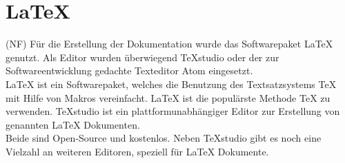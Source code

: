 \section{LaTeX}
(NF) Für die Erstellung der Dokumentation wurde das Softwarepaket LaTeX genutzt. Als Editor wurden überwiegend TeXstudio oder der zur Softwareentwicklung gedachte Texteditor Atom eingesetzt.\\
LaTeX ist ein Softwarepaket, welches die Benutzung des Textsatzsystems TeX mit Hilfe von Makros vereinfacht.
LaTeX ist die populärste Methode TeX zu verwenden.
TeXstudio ist ein plattformunabhängiger Editor zur Erstellung von genannten LaTeX Dokumenten.\\
Beide sind Open-Source und kostenlos. Neben TeXstudio gibt es noch eine Vielzahl an weiteren Editoren, speziell für LaTeX Dokumente.

